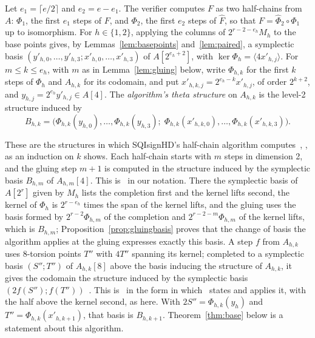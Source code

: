 \documentclass[version=preprint]{iacrcc}
\begin{document}
    \begin{definition}
        \label{def:structures}
        Let $e_1 = \lceil e/2 \rceil$ and $e_2 = e - e_1$. The verifier
        computes $F$ as two half-chains from $A$: $\Phi_1$, the first $e_1$
        steps of $F$, and $\Phi_2$, the first $e_2$ steps of $\widehat F$, so
        that $F = \widehat\Phi_2 \circ \Phi_1$ up to isomorphism. For $h \in \{1, 2\}$, applying the columns of
        $2^{r - 2 - e_h} M_h$ to the base points gives, by
        Lemmas~\ref{lem:basepoints} and~\ref{lem:paired}, a symplectic basis
        $(y'_{h,0}, \ldots, y'_{h,3}; x'_{h,0}, \ldots, x'_{h,3})$ of $A[2^{e_h +
            2}]$, with $\ker \Phi_h = \langle 4 x'_{h,j} \rangle$. For $m \le k \le
        e_h$, with $m$ as in Lemma~\ref{lem:gluing} below, write $\Phi_{h,k}$ for the first $k$ steps of $\Phi_h$ and $A_{h,k}$
        for its codomain, and put $x'_{h,k,j} = 2^{e_h - k} x'_{h,j}$, of order
        $2^{k+2}$, and $y_{h,j} = 2^{e_h} y'_{h,j} \in A[4]$. The \emph{algorithm's
            theta structure} on $A_{h,k}$ is the level-2 structure induced by
        \[
        B_{h,k} = \bigl(\Phi_{h,k}(y_{h,0}), \ldots, \Phi_{h,k}(y_{h,3});\;
        \Phi_{h,k}(x'_{h,k,0}), \ldots, \Phi_{h,k}(x'_{h,k,3})\bigr).
        \]
    \end{definition}

    These are the structures in which SQIsignHD's half-chain algorithm
    computes~\cite[Appendix F]{DLRW24}, \cite[Section 5.3 and Appendix
    C]{Dar24}, as an induction on $k$ shows. Each half-chain starts with $m$
    steps in dimension 2, and the gluing step $m + 1$ is computed in the
    structure induced by the symplectic basis $B_{h,m}$ of $A_{h,m}[4]$.
    This is~\cite[Appendix C.2.2 and Lemma 31]{Dar24} in our notation. There
    the symplectic basis of $A[2^r]$ given by $M_h$ lists the completion first
    and the kernel lifts second, the kernel of $\Phi_h$ is $2^{r - e_h}$ times
    the span of the kernel lifts, and the gluing uses the basis formed by
    $2^{r-2}\Phi_{h,m}$ of the completion and $2^{r-2-m}\Phi_{h,m}$ of the
    kernel lifts, which is $B_{h,m}$; Proposition~\ref{prop:gluingbasis}
    proves that the change of basis the algorithm applies at the gluing
    expresses exactly this basis. A step $f$ from $A_{h,k}$
    uses 8-torsion points $T''$ with $4T''$ spanning its kernel; completed to a
    symplectic basis $(S''; T'')$ of $A_{h,k}[8]$ above the basis inducing the
    structure of $A_{h,k}$, it gives the codomain the structure induced by the
    symplectic basis $(2f(S''); f(T''))$~\cite[Sections 4.1 and 4.2]{Dar24}.
    This is~\cite[Theorem 56]{DLRW24} in the form in which~\cite{Dar24} states
    and applies it, with the half above the kernel second, as here. With
    $2S'' = \Phi_{h,k}(y_h)$ and $T'' = \Phi_{h,k}(x'_{h,k+1})$, that basis is
    $B_{h,k+1}$. Theorem~\ref{thm:base} below is a statement about this
    algorithm.
\end{document}

